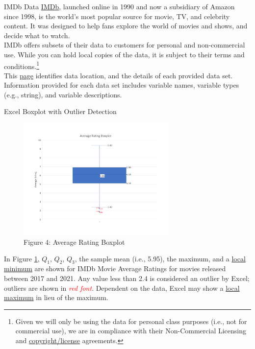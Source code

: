 \documentclass[pdf]{beamer}
\theoremstyle{remark}
\theoremstyle{definition}
\begin{document}
\begin{frame}[t]{IMDb Data}
\href{https://www.imdb.com/}{IMDb}, launched online in 1990 and now a subsidiary of Amazon since 1998, is the world's most popular source for movie, TV, and celebrity content.  It was designed to help fans explore the world of movies and shows, and decide what to watch. \\
\vspace{1.5ex}
IMDb offers subsets of their data  to customers for personal and non-commercial use. While you can hold local copies of the data, it is subject to their terms and conditions.\footnote{Given we will only be using the data for personal class purposes (i.e., not for commercial use), we are in compliance with their Non-Commercial Licensing and \href{https://www.imdb.com/conditions?pf_rd_m=A2FGELUUNOQJNL&pf_rd_p=3aefe545-f8d3-4562-976a-e5eb47d1bb18&pf_rd_r=F27NY89W6WHX7CDGGP5S&pf_rd_s=center-1&pf_rd_t=60601&pf_rd_i=interfaces&ref_=fea_mn_lk2}{copyright/license} agreements.} 
\\
\vspace{1.5ex}
This \href{https://www.imdb.com/interfaces/}{page} identifies data location, and the details of each provided data set.  Information provided for each data set includes variable names, variable types (e.g., string), and variable descriptions. 
\end{frame}

\begin{frame}[t]{Excel Boxplot with Outlier Detection}
\begin{figure}[htbp]
    \centering
    \captionsetup{justification=centering}
    \includegraphics[clip, trim=0cm 2.3cm 0cm 2.3cm, width=0.7\textwidth]{Images/averageRating_Boxplot.pdf}  
    \caption{Figure 4: Average Rating Boxplot}
    \label{fig:arboxplot}
\end{figure}
\vspace{-2.0ex}
\small
In Figure \ref{fig:arboxplot}, $Q_1$, $Q_2$, $Q_3$, the sample mean (i.e., 5.95), the maximum, and a \underline{local} \underline{minimum} are shown for IMDb Movie Average Ratings for movies released between 2017 and 2021. Any value less than 2.4 is considered an outlier by Excel;  outliers are shown in \emph{\textcolor{red}{red font}}.  Dependent on the data, Excel may show a \underline{local} \underline{maximum} in lieu of the maximum.\\
\end{frame}
\end{document}
